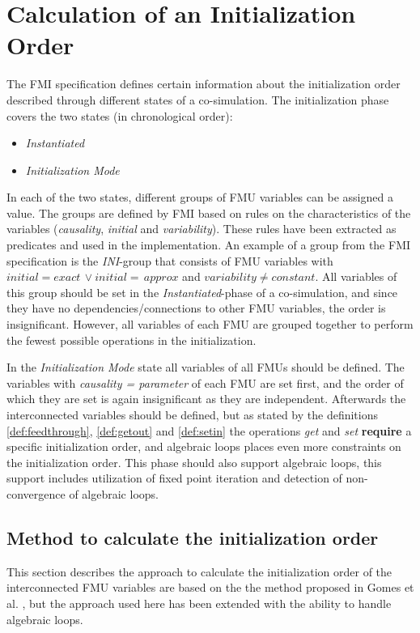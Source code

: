 \section{Calculation of an Initialization Order}\label{sc:initilization}
The FMI specification defines certain information about the initialization order described through different states of a co-simulation. The initialization phase covers the two states (in chronological order):
\begin{itemize}
    \item \textit{Instantiated}
    \item \textit{Initialization Mode}
\end{itemize}
In each of the two states, different groups of FMU variables can be assigned a value. The groups are defined by FMI based on rules on the characteristics of the variables (\textit{causality}, \textit{initial} and \textit{variability}). These rules have been extracted as predicates and used in the implementation. 
An example of a group from the FMI specification is the \textit{INI}-group that consists of FMU variables with $initial = exact\, \lor initial = \,approx $  and $variability \neq constant$. All variables of this group should be set in the \textit{Instantiated}-phase of a co-simulation, and since they have no dependencies/connections to other FMU variables, the order is insignificant. However, all variables of each FMU are grouped together to perform the fewest possible operations in the initialization. 

In the \textit{Initialization Mode} state all variables of all FMUs should be defined.
The variables with \textit{causality = parameter} of each FMU are set first, and the order of which they are set is again insignificant as they are independent.
Afterwards the interconnected variables should be defined, but as stated by the definitions \ref{def:feedthrough}, \ref{def:getout} and \ref{def:setin} the operations \textit{get} and \textit{set} \textbf{require} a specific initialization order, and algebraic loops places even more constraints on the initialization order. This phase should also support algebraic loops, this support includes utilization of fixed point iteration and detection of non-convergence of algebraic loops.

\subsection{Method to calculate the initialization order}
This section describes the approach to calculate the initialization order of the interconnected FMU variables are based on the the method proposed in Gomes et al. \cite{Gomes2019b, BromanCompositionCo-Simulation}, but the approach used here has been extended with the ability to handle algebraic loops. 

